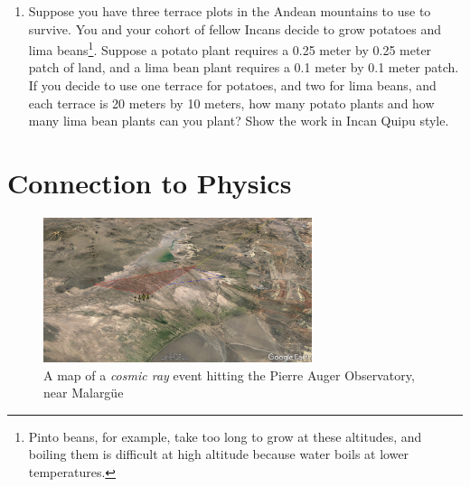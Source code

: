 \documentclass[10pt]{article}
\begin{document}
\begin{enumerate}
\item Suppose you have three terrace plots in the Andean mountains to use to survive.  You and your cohort of fellow Incans decide to grow potatoes and lima beans\footnote{Pinto beans, for example, take too long to grow at these altitudes, and boiling them is difficult at high altitude because water boils at lower temperatures.}. Suppose a potato plant requires a 0.25 meter by 0.25 meter patch of land, and a lima bean plant requires a 0.1 meter by 0.1 meter patch.  If you decide to use one terrace for potatoes, and two for lima beans, and each terrace is 20 meters by 10 meters, how many potato plants and how many lima bean plants can you plant? Show the work in Incan Quipu style.  \\ \vspace{4cm}
\end{enumerate}

\section{Connection to Physics}

\begin{figure}
\centering
\includegraphics[width=0.7\textwidth]{figures/auger.png}
\caption{\label{fig:auger} A map of a \textit{cosmic ray} event hitting the Pierre Auger Observatory, near Malarg\"{u}e}
\end{figure}
\end{document}
